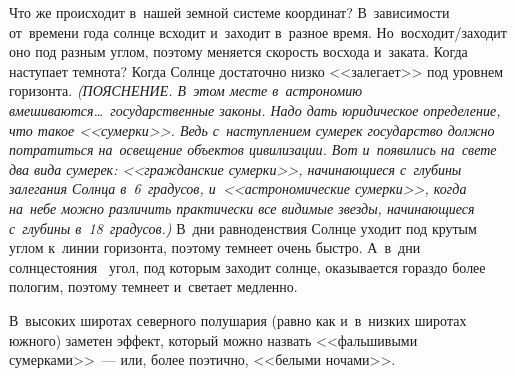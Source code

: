 
Что же происходит в~нашей земной системе координат? В~зависимости от~времени года солнце всходит
и~заходит в~разное время.
Но~восходит/заходит оно под разным углом, поэтому меняется
скорость восхода и~заката. Когда наступает темнота? Когда Солнце достаточно низко <<залегает>> под
уровнем горизонта. \textit{(ПОЯСНЕНИЕ. В~этом месте в~астрономию вмешиваются\ldots\  государственные
законы. Надо дать юридическое определение, что такое <<сумерки>>. Ведь с~наступлением сумерек
государство должно потратиться на~освещение объектов цивилизации. Вот и~появились на~свете два вида
сумерек: <<гражданские сумерки>>, начинающиеся с~глубины залегания Солнца в~6~градусов,
и~<<астрономические сумерки>>, когда на~небе можно различить практически все видимые звезды,
начинающиеся с~глубины в~18~градусов.)} В~дни равноденствия Солнце уходит под крутым углом к~линии
горизонта, поэтому темнеет очень быстро. А~в~дни солнцестояния~ угол, под которым заходит
солнце, оказывается гораздо более пологим, поэтому темнеет и~светает медленно.


В~высоких широтах северного полушария (равно как и~в~низких широтах южного) заметен эффект, который
можно назвать <<фальшивыми сумерками>>~--- или, более поэтично, <<белыми ночами>>.

